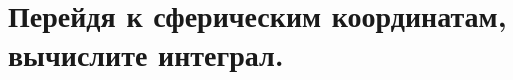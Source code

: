 \documentclass[a4paper, fleqn]{article}
\begin{document}
    
    \section*{Перейдя к сферическим координатам, вычислите интеграл.}
    
    
\end{document}
